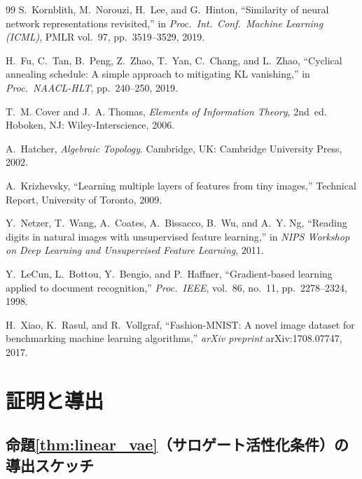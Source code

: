 \documentclass[11pt,a4paper]{jsarticle}
\begin{document}
\begin{thebibliography}{99}
S.~Kornblith, M.~Norouzi, H.~Lee, and G.~Hinton,
``Similarity of neural network representations revisited,''
in \textit{Proc.\ Int.\ Conf.\ Machine Learning (ICML)}, PMLR vol.~97,
pp.~3519--3529, 2019.

H.~Fu, C.~Tan, B.~Peng, Z.~Zhao, T.~Yan, C.~Chang, and L.~Zhao,
``Cyclical annealing schedule: A simple approach to mitigating KL
vanishing,''
in \textit{Proc.\ NAACL-HLT}, pp.~240--250, 2019.

T.~M. Cover and J.~A. Thomas,
\textit{Elements of Information Theory}, 2nd~ed.
Hoboken, NJ: Wiley-Interscience, 2006.

A.~Hatcher,
\textit{Algebraic Topology}.
Cambridge, UK: Cambridge University Press, 2002.

A.~Krizhevsky,
``Learning multiple layers of features from tiny images,''
Technical Report, University of Toronto, 2009.

Y.~Netzer, T.~Wang, A.~Coates, A.~Bissacco, B.~Wu, and A.~Y. Ng,
``Reading digits in natural images with unsupervised feature learning,''
in \textit{NIPS Workshop on Deep Learning and Unsupervised Feature
Learning}, 2011.

Y.~LeCun, L.~Bottou, Y.~Bengio, and P.~Haffner,
``Gradient-based learning applied to document recognition,''
\textit{Proc.\ IEEE}, vol.~86, no.~11, pp.~2278--2324, 1998.

H.~Xiao, K.~Rasul, and R.~Vollgraf,
``Fashion-MNIST: A novel image dataset for benchmarking machine learning
algorithms,''
\textit{arXiv preprint} arXiv:1708.07747, 2017.

\end{thebibliography}

\appendix

\section{証明と導出}\label{app:proofs}

\subsection{命題\ref{thm:linear_vae}（サロゲート活性化条件）の導出スケッチ}
\end{document}
